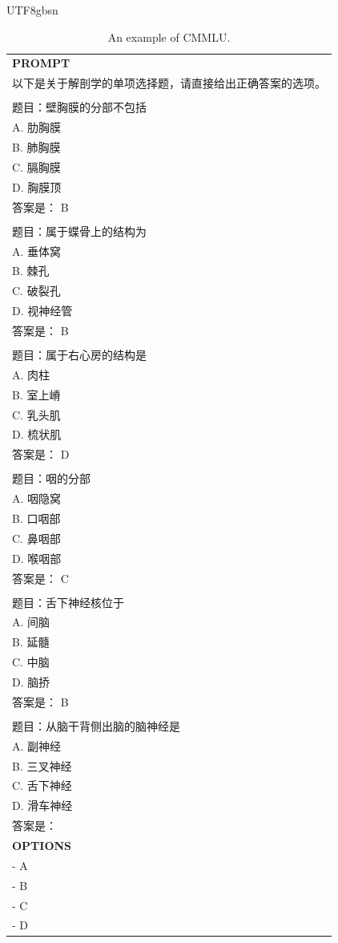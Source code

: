 \documentclass[11pt, a4paper, logo, copyright, nonumbering]{deepseek}
\begin{document}
\begin{CJK*}{UTF8}{gbsn}
\begin{table}[h]
    \centering \small
\begin{tabular}{p{12cm}}
\toprule
\textbf{PROMPT}\\
以下是关于解剖学的单项选择题，请直接给出正确答案的选项。
\\
\\题目：壁胸膜的分部不包括
\\A. 肋胸膜
\\B. 肺胸膜
\\C. 膈胸膜
\\D. 胸膜顶
\\答案是： B
\\
\\题目：属于蝶骨上的结构为
\\A. 垂体窝
\\B. 棘孔
\\C. 破裂孔
\\D. 视神经管
\\答案是： B
\\
\\题目：属于右心房的结构是
\\A. 肉柱
\\B. 室上嵴
\\C. 乳头肌
\\D. 梳状肌
\\答案是： D
\\
\\题目：咽的分部
\\A. 咽隐窝
\\B. 口咽部
\\C. 鼻咽部
\\D. 喉咽部
\\答案是： C
\\
\\题目：舌下神经核位于
\\A. 间脑
\\B. 延髓
\\C. 中脑
\\D. 脑挢
\\答案是： B
\\
\\题目：从脑干背侧出脑的脑神经是
\\A. 副神经
\\B. 三叉神经
\\C. 舌下神经
\\D. 滑车神经
\\答案是：\\
\midrule
\textbf{OPTIONS}\\
- A\\
- B\\
- C\\
- D\\
\bottomrule
\end{tabular}
    \caption{\centering An example of CMMLU.}
    \label{tab:cmmlu_eval_format_example}
\end{table}


\end{CJK*}
\end{document}
